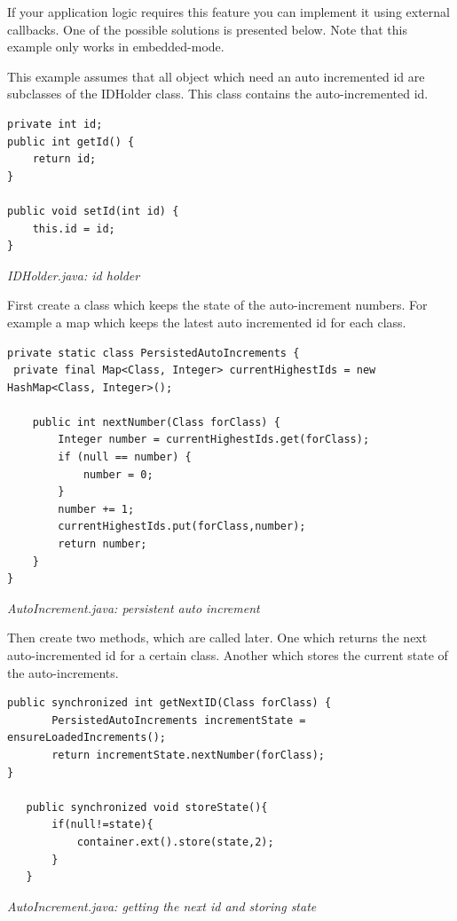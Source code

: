 If your application logic requires this feature you can implement it using external callbacks. One of the possible solutions is presented below. Note that this example only works in embedded-mode.

This example assumes that all object which need an auto incremented id are subclasses of the IDHolder class. This class contains the auto-incremented id.

\begin{lstlisting}
private int id;
public int getId() {
    return id;
}

public void setId(int id) {
    this.id = id;
}
\end{lstlisting}

{\small\itshape IDHolder.java: id holder\par}
\medskip

First create a class which keeps the state of the auto-increment numbers. For example a map which keeps the latest auto incremented id for each class.

\begin{lstlisting}
private static class PersistedAutoIncrements {
 private final Map<Class, Integer> currentHighestIds = new HashMap<Class, Integer>();

    public int nextNumber(Class forClass) {
        Integer number = currentHighestIds.get(forClass);
        if (null == number) {
            number = 0;
        }
        number += 1;
        currentHighestIds.put(forClass,number);
        return number;
    }
}
\end{lstlisting}

{\small\itshape AutoIncrement.java: persistent auto increment\par}
\medskip

Then create two methods, which are called later. One which returns the next auto-incremented id for a certain class. Another which stores the current state of the auto-increments.

\begin{lstlisting}
public synchronized int getNextID(Class forClass) {
       PersistedAutoIncrements incrementState = ensureLoadedIncrements();
       return incrementState.nextNumber(forClass);
}

   public synchronized void storeState(){
       if(null!=state){
           container.ext().store(state,2);            
       }
   }
\end{lstlisting}

{\small\itshape AutoIncrement.java: getting the next id and storing state\par}
\medskip

